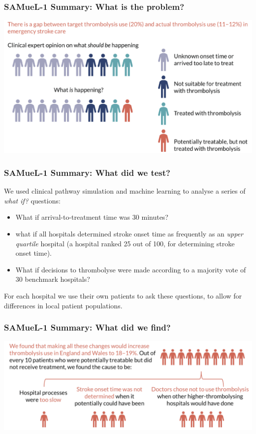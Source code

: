 \documentclass{beamer}
\begin{document}

\begin{frame}
\frametitle{SAMueL-1 Summary: What is the problem?}
\begin{center}
\includegraphics[width=1.0\textwidth]{./images/sam_summary_pt_1}
\end{center}
\end{frame}

\begin{frame}
\frametitle{SAMueL-1 Summary: What did we test?}

We used clinical pathway simulation and machine learning to analyse a series of \emph{what if?} questions:

\begin{itemize}
    \setlength\itemsep{3mm}
    \item What if arrival-to-treatment time was 30 minutes?
    \item what if all hospitals determined stroke onset time as frequently as an \emph{upper quartile} hospital (a hospital ranked 25 out of 100, for determining stroke onset time).
    \item What if decisions to thrombolyse were made according to a majority vote of 30 benchmark hospitals?
\end{itemize}

For each hospital we use their own patients to ask these questions, to allow for differences in local patient populations.
\end{frame}

\begin{frame}
\frametitle{SAMueL-1 Summary: What did we find?}
\begin{center}
\includegraphics[width=1.0\textwidth]{./images/sam_summary_pt_3}
\end{center}
\end{frame}
\end{document}
